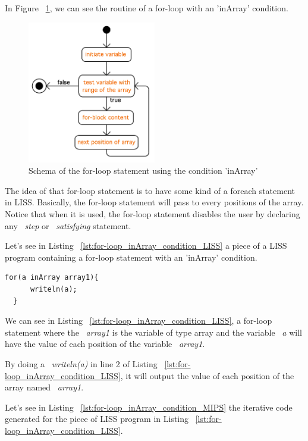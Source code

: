 \documentclass[
  oneside,
  11pt, a4paper,
  footinclude=true,
  headinclude=true,
  cleardoublepage=empty
]{scrbook}
\begin{document}
In Figure ~\ref{fig:for-loop_inArray}, we can see the routine of a for-loop with an 'inArray' condition.

\begin{figure}[h!]
  \centering
    \includegraphics[width=0.5\textwidth]{img/for-loop_inArray.png}
    \caption{Schema of the for-loop statement using the condition 'inArray'}
    \label{fig:for-loop_inArray}
\end{figure}

The idea of that for-loop statement is to have some kind of a foreach statement in LISS. Basically, the for-loop statement will pass to every positions of the array. Notice that when it is used, the for-loop statement disables the user by declaring any ~\textit{step} or ~\textit{satisfying} statement.

Let's see in Listing ~\ref{lst:for-loop_inArray_condition_LISS} a piece of a LISS program containing a for-loop statement with an 'inArray' condition.

\begin{lstlisting}[caption={Example of a for-loop statement with 'inArray' condition in LISS},label={lst:for-loop_inArray_condition_LISS}]
  for(a inArray array1){
      writeln(a);
  }
\end{lstlisting}

We can see in Listing ~\ref{lst:for-loop_inArray_condition_LISS}, a for-loop statement where the ~\textit{array1} is the variable of type array and the variable ~\textit{a} will have the value of each position of the variable ~\textit{array1}.

By doing a ~\textit{writeln(a)} in line 2 of Listing ~\ref{lst:for-loop_inArray_condition_LISS}, it will output the value of each position of the array named ~\textit{array1}.

Let's see in Listing ~\ref{lst:for-loop_inArray_condition_MIPS} the iterative code generated for the piece of LISS program in Listing ~\ref{lst:for-loop_inArray_condition_LISS}.
\end{document}
